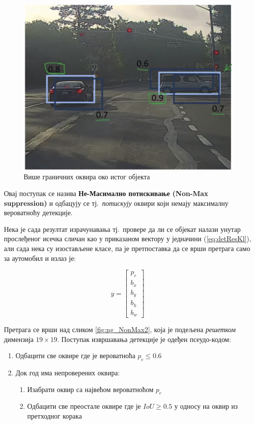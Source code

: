 \documentclass[12pt, а4paper]{article}
\begin{document}
\begin{figure}[H]
  \centering
      \includegraphics[scale=0.6]{slike/ngNonMax1.png}
  \caption{Више граничних оквира око истог објекта}
  \label{fig:ng_NonMax1}
\end{figure}

Овај поступак се назива \textbf{Не-Масимално потискивање (Non-Max suppression)}
и одбацују се тј.\ \textit{потискују} оквири који немају максималну вероватноћу
детекције.

Нека је сада резултат израчунавања тј.\ провере да ли се објекат налази
унутар прослеђеног исечка сличан као у приказаном вектору у
једначини (\ref{eq:detResKl}), али сада нека су изостављене класе, па
је претпоставка да се врши претрага само за аутомобил и излаз је:

\begin{equation}
y =
\begin{bmatrix}
 p_c \\
 b_x \\
 b_y \\
 b_h \\
 b_w
\end{bmatrix}
\label{eq:detRes}
\end{equation}

Претрага се врши над сликом \ref{fig:ng_NonMax2}, која је подељена
\textit{решетком} димензија $19 \times 19$.
Поступак извршавања детекције је одеђен \mbox{псеудо-кодом}:
\begin{enumerate}[label=\arabic*)]
\item Одбацити све оквире где је вероватноћа $p_c \leq 0.6$
\item Док год има непроверених оквира:
  \begin{enumerate}[label=(\roman*)]
  \item Изабрати оквир са највећом вероватноћом $p_c$
  \item Одбацити све преостале оквире где је $IoU \geq 0.5$ у односу на
  оквир из претходног корака
  \end{enumerate}
\end{enumerate}
\end{document}

